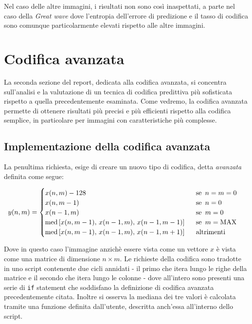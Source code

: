 Nel caso delle altre immagini, i risultati non sono così inaspettati, a parte nel caso della \textsl{Great wave} dove l'entropia dell'errore di predizione e il tasso di codifica sono comunque particolarmente elevati rispetto alle altre immagini.





\newpage\section{Codifica avanzata}
La seconda sezione del report, dedicata alla codifica avanzata, si concentra sull'analisi e la valutazione di un tecnica di codifica predittiva più sofisticata rispetto a quella precedentemente esaminata. Come vedremo, la codifica avanzata permette di ottenere risultati più precisi e più efficienti rispetto alla codifica semplice, in particolare per immagini con caratteristiche più complesse.

\vspace{15px}\subsection{Implementazione della codifica avanzata}

La penultima richiesta, esige di creare un nuovo tipo di codifica, detta \textsl{avanzata} definita come segue:

\begin{gather*}
    y(n, m) = 
    \begin{cases}
        x(n, m) - 128 \hspace{161px} \text{se } \, n = m = 0 \\
        x(n, m - 1) \hspace{171px} \text{se } \, n = 0\\
        x(n - 1, m) \hspace{171px} \text{se } \, m = 0\\
        \text{med}\left[ x(n, m - 1),\, x(n - 1, m),\, x(n - 1, m - 1) \right] \hspace{15px} \text{se } \, m = \text{MAX}\\
        \text{med}\left[ x(n, m - 1),\, x(n - 1, m),\, x(n - 1, m + 1) \right] \hspace{15px} \text{altrimenti}
    \end{cases}
\end{gather*} 

\noindent Dove in questo caso l'immagine anzichè essere vista come un vettore $x$ è vista come una matrice di dimensione $n \times m$. Le richieste della codifica sono tradotte in uno script contenente due cicli annidati - il primo che itera lungo le righe della matrice e il secondo che itera lungo le colonne - dove all'intero sono presenti una serie di \texttt{if} statement che soddisfano la definizione di codifica avanzata precedentemente citata. Inoltre si osserva la mediana dei tre valori è calcolata tramite una funzione definita dall'utente, descritta anch'essa all'interno dello script. 

